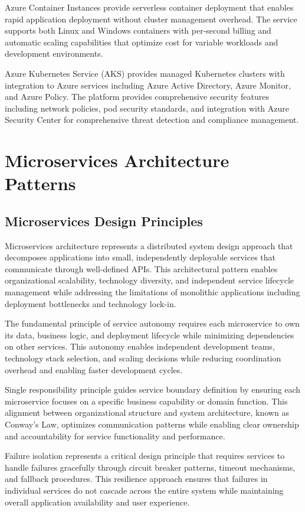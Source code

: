 Azure Container Instances provide serverless container deployment that enables rapid application deployment without cluster management overhead. The service supports both Linux and Windows containers with per-second billing and automatic scaling capabilities that optimize cost for variable workloads and development environments.

Azure Kubernetes Service (AKS) provides managed Kubernetes clusters with integration to Azure services including Azure Active Directory, Azure Monitor, and Azure Policy. The platform provides comprehensive security features including network policies, pod security standards, and integration with Azure Security Center for comprehensive threat detection and compliance management.

\section{Microservices Architecture Patterns}

\subsection{Microservices Design Principles}

Microservices architecture represents a distributed system design approach that decomposes applications into small, independently deployable services that communicate through well-defined APIs. This architectural pattern enables organizational scalability, technology diversity, and independent service lifecycle management while addressing the limitations of monolithic applications including deployment bottlenecks and technology lock-in.

The fundamental principle of service autonomy requires each microservice to own its data, business logic, and deployment lifecycle while minimizing dependencies on other services. This autonomy enables independent development teams, technology stack selection, and scaling decisions while reducing coordination overhead and enabling faster development cycles.

Single responsibility principle guides service boundary definition by ensuring each microservice focuses on a specific business capability or domain function. This alignment between organizational structure and system architecture, known as Conway's Law, optimizes communication patterns while enabling clear ownership and accountability for service functionality and performance.

Failure isolation represents a critical design principle that requires services to handle failures gracefully through circuit breaker patterns, timeout mechanisms, and fallback procedures. This resilience approach ensures that failures in individual services do not cascade across the entire system while maintaining overall application availability and user experience.

